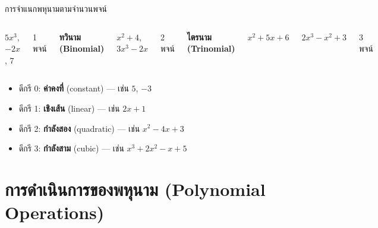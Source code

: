 \documentclass[11pt, aspectratio=169]{beamer}
\begin{document}
\begin{frame}{การจำแนกพหุนามตามจำนวนพจน์}
\begin{columns}[T]
      $5x^3$, \quad $-2x$, \quad $7$

      1 พจน์

      \centering
      \textbf{ทวินาม (Binomial)}

      $x^2 + 4$, \quad $3x^3 - 2x$

      2 พจน์

      \centering
      \textbf{ไตรนาม (Trinomial)}

      $x^2 + 5x + 6$

      $2x^3 - x^2 + 3$

      3 พจน์
  \end{columns}

  \medskip
  \begin{explanation}[การจำแนกตามดีกรี]
    \begin{itemize}
      \item ดีกรี 0: \textbf{ค่าคงที่} (constant) — เช่น $5$, $-3$
      \item ดีกรี 1: \textbf{เชิงเส้น} (linear) — เช่น $2x + 1$
      \item ดีกรี 2: \textbf{กำลังสอง} (quadratic) — เช่น $x^2 - 4x + 3$
      \item ดีกรี 3: \textbf{กำลังสาม} (cubic) — เช่น $x^3 + 2x^2 - x + 5$
    \end{itemize}
  \end{explanation}
\end{frame}

\section{การดำเนินการของพหุนาม (Polynomial Operations)}
\end{document}
